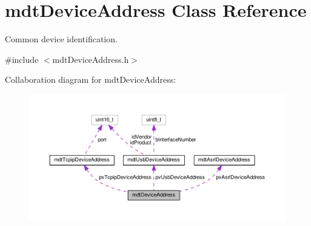 \hypertarget{classmdt_device_address}{\section{mdt\-Device\-Address Class Reference}
\label{classmdt_device_address}
}


Common device identification.  




{\ttfamily \#include $<$mdt\-Device\-Address.\-h$>$}



Collaboration diagram for mdt\-Device\-Address\-:
\nopagebreak
\begin{figure}[H]
\begin{center}
\leavevmode
\includegraphics[width=350pt]{classmdt_device_address__coll__graph}
\end{center}
\end{figure}
